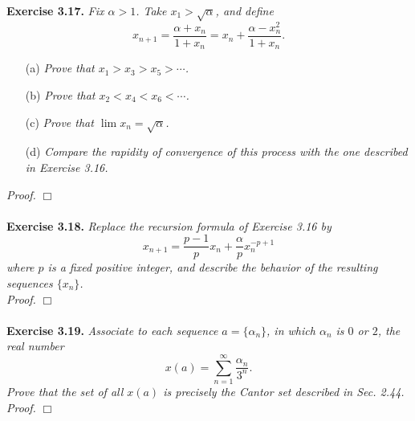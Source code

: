 \documentclass{article}
\begin{document}



\textbf{Exercise 3.17.}
\emph{Fix $\alpha > 1$. Take $x_1 > \sqrt{\alpha}$, and define
$$x_{n+1} = \frac{\alpha+x_n}{1+x_n} = x_n + \frac{\alpha-x_n^2}{1+x_n}.$$}
\begin{enumerate}
\item[(a)]
\emph{Prove that $x_1 > x_3 > x_5 > \cdots$.}
\item[(b)]
\emph{Prove that $x_2 < x_4 < x_6 < \cdots$.}
\item[(c)]
\emph{Prove that $\lim x_n = \sqrt{\alpha}$.}
\item[(d)]
\emph{Compare the rapidity of convergence of this process
with the one described in Exercise 3.16.} \\
\end{enumerate}

\emph{Proof.}
$\Box$ \\\\






\textbf{Exercise 3.18.}
\emph{Replace the recursion formula of Exercise 3.16 by
$$x_{n+1} = \frac{p-1}{p} x_n + \frac{\alpha}{p} x_n^{-p+1}$$
where $p$ is a fixed positive integer,
and describe the behavior of the resulting sequences $\{x_n\}$.} \\

\emph{Proof.}
$\Box$ \\\\






\textbf{Exercise 3.19.}
\emph{Associate to each sequence $a = \{\alpha_n\}$,
in which $\alpha_n$ is $0$ or $2$, the real number
$$x(a) = \sum_{n=1}^{\infty} \frac{\alpha_n}{3^n}.$$
Prove that the set of all $x(a)$ is precisely the Cantor set described in Sec. 2.44.} \\

\emph{Proof.}
$\Box$ \\\\



\end{document}
